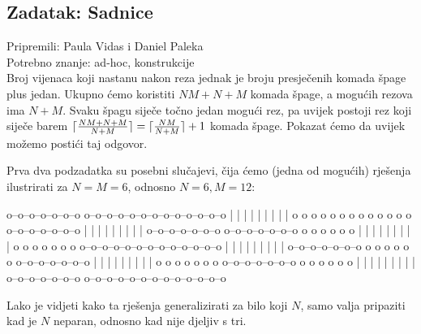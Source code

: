 \subsection*{Zadatak: Sadnice}
\textsf{Pripremili: Paula Vidas i Daniel Paleka}\\
\textsf{Potrebno znanje: ad-hoc, konstrukcije}\\

Broj vijenaca koji nastanu nakon reza jednak je broju presječenih komada špage
plus jedan. Ukupno ćemo koristiti $NM + N + M$ komada špage, a mogućih rezova
ima $N + M$. Svaku špagu siječe točno jedan mogući rez, pa uvijek postoji rez
koji siječe barem $\lceil\frac{NM + N + M}{N + M}\rceil = \lceil\frac{NM}{N + M}\rceil +
1$ komada špage. Pokazat ćemo da uvijek možemo postići taj odgovor.

Prva dva podzadatka su posebni slučajevi, čija ćemo (jedna od mogućih) rješenja
ilustrirati za $N = M = 6$, odnosno $N = 6, M = 12$:

\begin{verbbox}
o--o--o--o--o--o--o              o--o--o--o--o--o--o--o--o--o--o--o--o
|  |  |           |              |  |  |  |        |
o  o  o  o  o  o  o              o  o  o  o  o  o  o--o--o--o--o--o--o
         |  |  |  |                          |  |  |  |  |
o--o--o--o--o--o--o              o--o--o--o--o--o--o  o  o  o  o  o  o
|  |  |           |                                |        |  |  |  |
o  o  o  o  o  o  o              o--o--o--o--o--o--o--o--o--o--o--o--o
         |  |  |  |              |  |  |  |        |
o--o--o--o--o--o--o              o  o  o  o  o  o  o--o--o--o--o--o--o
|  |  |           |                          |  |  |  |  |
o  o  o  o  o  o  o              o--o--o--o--o--o--o  o  o  o  o  o  o
         |  |  |  |                                |        |  |  |  |
o--o--o--o--o--o--o              o--o--o--o--o--o--o--o--o--o--o--o--o
\end{verbbox}
\begin{figure}[H]
  \centering
  \theverbbox
\end{figure}

Lako je vidjeti kako ta rješenja generalizirati za bilo koji $N$, samo
valja pripaziti kad je $N$ neparan, odnosno kad nije djeljiv s tri.

